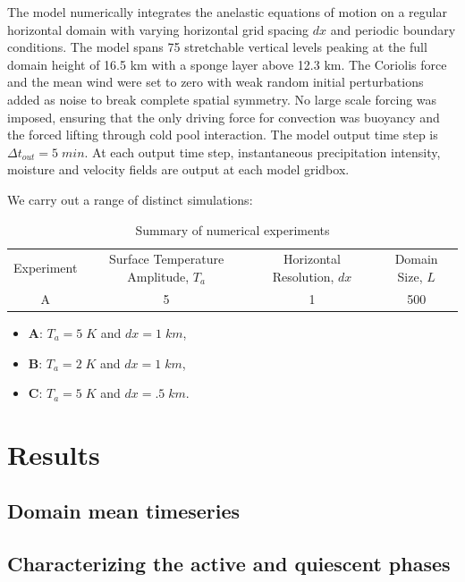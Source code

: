 \documentclass[draft,linenumbers]{agujournal2019}
\begin{document}
\noindent
The model numerically integrates the anelastic equations of motion on a regular horizontal domain with varying horizontal grid spacing $dx$ and periodic boundary conditions. 
The model spans 75 stretchable vertical levels peaking at the full domain height of 16.5 km with a sponge layer above 12.3 km.
The Coriolis force and the mean wind were set to zero with weak random initial perturbations added as noise to break complete spatial symmetry. 
No large scale forcing was imposed,
ensuring that the only driving force for convection was buoyancy and the forced lifting through cold pool interaction.
The model output time step is $\Delta t_{out}=5\;min$. 
At each output time step, instantaneous precipitation intensity, moisture and velocity fields are output at each model gridbox. 

We carry out a range of distinct simulations:
\begin{table}
    \centering
    \begin{tabular}{c|c|c|c}
        Experiment & Surface Temperature Amplitude, $T_a$ & Horizontal Resolution, $dx$ & Domain Size, $L$\\
        A & 5 & 1 & 500\\
    \end{tabular}
    \caption{Summary of numerical experiments}
    \label{tab:experiments_overview}
\end{table}

\begin{itemize}
    \item {\bf A}: $T_a=5\;K$ and $dx=1\;km$,
    \item {\bf B}: $T_a=2\;K$ and $dx=1\;km$,
    \item {\bf C}: $T_a=5\;K$ and $dx=.5\;km$.
\end{itemize}


\section{Results}\label{sec:results}

\subsection{Domain mean timeseries}

\subsection{Characterizing the active and quiescent phases}
\end{document}
